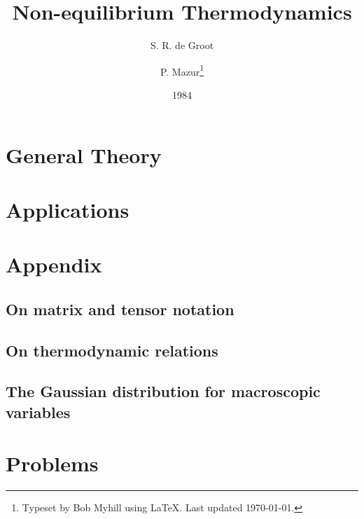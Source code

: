 \documentclass[11pt,a4paper,footinclude=true,headinclude=true]{scrbook} %
\begin{document}
    \title{Non-equilibrium Thermodynamics}
    \author{S. R. de Groot \and P. Mazur\thanks{Typeset by Bob Myhill using \LaTeX. Last updated \today.}}
    \date{1984}
    \publishers{Originally published by DOVER PUBLICATIONS, INC., NEW YORK}
    \maketitle
    
	\pagestyle{scrheadings}
	\markboth{\spacedlowsmallcaps{\contentsname}}{\spacedlowsmallcaps{\contentsname}}
	
	\tableofcontents 


    
    
    \cleardoublepage\part{General Theory}
    
    
    
    
    
    
    
    

    \cleardoublepage\part{Applications}
    
    
    
    
    
    
    

%	

    \appendix
    \cleardoublepage\part{Appendix}
    \chapter{On matrix and tensor notation}
    \chapter{On thermodynamic relations}
    \chapter{The Gaussian distribution for macroscopic variables}
    
    \cleardoublepage\part{Problems}
    
    
\end{document}
